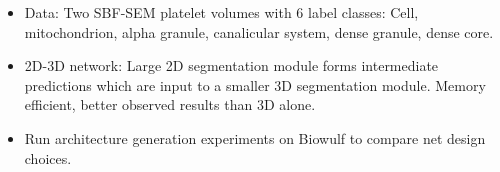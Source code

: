 \documentclass[final]{beamer}
\newlength{\onecolwid}
\newlength{\twocolwid}
\renewcommand{\emph}[1]{{\color{nibib2} #1}}
\begin{document}
\begin{frame}[t]
\begin{columns}[t]
\begin{column}{\twocolwid}
    \begin{columns}[t]
        
    
    \begin{column}{\onecolwid}
        \begin{tcolorbox}[title=Methods]
            \begin{itemize}
                \item \emph{Data}: Two SBF-SEM platelet volumes with 6 label classes: Cell, mitochondrion, alpha granule, canalicular system, dense granule, dense core.
                \item \emph{2D-3D network}: Large 2D segmentation module forms intermediate predictions which are input to a smaller 3D segmentation module. Memory efficient, better observed results than 3D alone.
                \item Run architecture generation experiments on \emph{Biowulf} to compare net design choices.

\end{itemize}
\end{tcolorbox}
\end{column}
\end{columns}
\end{column}
\end{columns}
\end{frame}
\end{document}
